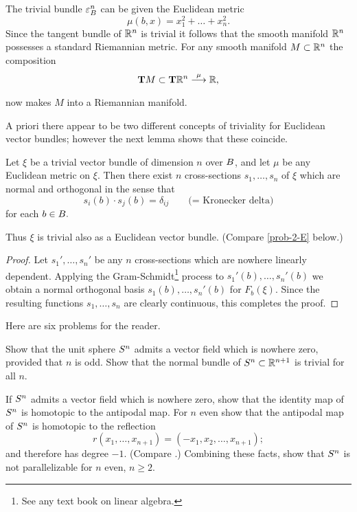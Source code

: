 \documentclass[../main]{subfiles}
\begin{document}
\begin{example} 
The trivial bundle $\varepsilon^n_{B}$ can be given the Euclidean metric
\[
\mu(b, x)=x_{1}^{2}+\dots+x_{n}^{2}.
\]
Since the tangent bundle of $\mathbb R^n$ is trivial it follows that the smooth manifold $\mathbb R^n$ possesses a standard Riemannian metric. For any smooth manifold $M \subset \mathbb R^n$ the composition
\[
\tangentTS{M} \subset \tangentTS{\bR^n}\varrightarrow{\mu} \bR, 
\]
now makes $M$ into a Riemannian manifold.
\end{example}


A priori there appear to be two different concepts of triviality for Euclidean vector bundles; however the next lemma shows that these coincide.


\begin{lemma}\label{lem:02.04}
Let $\xi$ be a trivial vector bundle of dimension $n$ over ${B}$, and let $\mu$ be any Euclidean metric on $\xi$. Then there exist $n$ cross-sections $s_1, \dots, s_n$ of $\xi$ which are normal and orthogonal in the sense that 
\[
s_i(b)\cdot s_j(b)= \delta_{ij} \qquad \text{(= Kronecker delta)} 
\] %
for each $b\in {B}.$
\end{lemma}


Thus $\xi$ is trivial also as a Euclidean vector bundle. (Compare \ref{prob-2-E} below.)


\begin{proof}
Let $s_1 ', \dots, s_n '$ be any $n$ cross-sections which are nowhere linearly dependent. Applying the Gram-Schmidt\footnote{See any text book on linear algebra.} process to $s_1 '(b), \dots, s_n '(b)$ we obtain a normal orthogonal basis $s_1 (b), \dots, s_n '(b)$ for $F_b(\xi)$. Since the resulting functions $s_1,\dots,s_n$ are clearly continuous, this completes the proof.
\end{proof}


Here are six problems for the reader.


\begin{problem}\label{prob-2-A}
Show that the unit sphere $S^{n}$ admits a vector field which is nowhere zero, provided that $n$ is odd. Show that the normal bundle of $S^{n}\subset\mathbb R^{n+1}$ is trivial for all $n$.
\end{problem}


\begin{problem}\label{prob-2-B}
If $S^{n}$ admits a vector field which is nowhere zero, show that the identity map of $S^{n}$ is homotopic to the antipodal map. For $n$ even show that the antipodal map of $S^{n}$ is homotopic to the reflection 
\[
r(x_1, \dots, x_{n+1}) = (-x_1, x_2 ,\dots, x_{n+1});
\]
and therefore has degree $-1$. (Compare \cite[p.304]{eilenbergsteenrod1952}.) Combining these facts, show that $S^{n}$ is not parallelizable for $n$ even, $n \geq 2$.
\end{problem}
\end{document}
